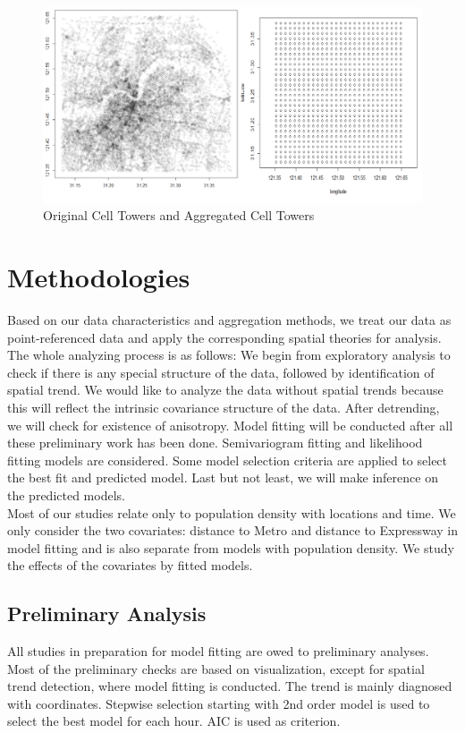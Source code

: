 \documentclass[hidelinks,12pt]{article}
\begin{document}
	\begin{figure}[!ht]
		\includegraphics[width=\textwidth]{tower.png}
		\caption{Original Cell Towers and Aggregated Cell Towers \label{fig:tower}}
	\end{figure}
	\FloatBarrier
	
	\section{Methodologies}\label{sec:meth}
	Based on our data characteristics and aggregation methods, we treat our data as point-referenced data and apply the corresponding spatial theories for analysis. The whole analyzing process is as follows: We begin from exploratory analysis to check if there is any special structure of the data, followed by identification of spatial trend. We would like to analyze the data without spatial trends because this will reflect the intrinsic covariance structure of the data. After detrending, we will check for existence of anisotropy. Model fitting will be conducted after all these preliminary work has been done. Semivariogram fitting and likelihood fitting models are considered. Some model selection criteria are applied to select the best fit and predicted model. Last but not least, we will make inference on the predicted models.\\
	
	Most of our studies relate only to population density with locations and time. We only consider the two covariates: distance to Metro and distance to Expressway in model fitting and is also separate from models with population density. We study the effects of the covariates by fitted models.
	
	\subsection{Preliminary Analysis}
 	All studies in preparation for model fitting are owed to preliminary analyses. Most of the preliminary checks are based on visualization, except for spatial trend detection, where model fitting is conducted. The trend is mainly diagnosed with coordinates. Stepwise selection starting with 2nd order model is used to select the best model for each hour. AIC is used as criterion.
 	
\end{document}
